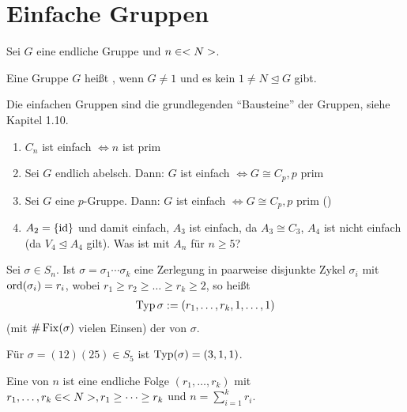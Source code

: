 \section{Einfache Gruppen}

Sei $G$ eine endliche Gruppe und $n \in <N>$.

\begin{definition}
	Eine Gruppe $G$ heißt , wenn $G \neq 1$ und es kein $1 \neq N \unlhd G$ gibt. %
\end{definition}

\begin{remark}
	Die einfachen Gruppen sind die grundlegenden ``Bausteine'' der Gruppen, siehe Kapitel 1.10.
\end{remark}

\begin{example}
	\begin{enumerate}
		\item $C_n$ ist einfach $\Leftrightarrow n$ ist prim
		\item Sei $G$ endlich abelsch. Dann: $G$ ist einfach $\Leftrightarrow G \cong C_p, p$ prim
		\item Sei $G$ eine $p$-Gruppe. Dann: $G$ ist einfach $\Leftrightarrow G \cong C_p, p$ prim ()
		\item $A_2 = \{\operatorname{id}\}$ und damit einfach, $A_3$ ist einfach, da $A_3 \cong C_3$, $A_4$ ist nicht einfach (da $V_4 \unlhd A_4$ gilt). Was ist mit $A_n$ für $n \geq 5$?
	\end{enumerate}
\end{example}

\begin{definition}[Typ]
	Sei $\sigma \in S_n$. Ist $\sigma = \sigma_1\cdots \sigma_k$ eine Zerlegung in paarweise disjunkte Zykel $\sigma_i$ mit $\operatorname{ord}(\sigma_i)=r_i$, wobei $r_1 \geq r_2 \geq \dots \geq r_k \geq 2$, so heißt
	\begin{align}
	\operatorname{Typ}{\sigma} := (r_1,\dots,r_k,1,\dots,1)\notag
	\end{align}
	(mit $\#\operatorname{Fix}(\sigma)$ vielen Einsen) der  von $\sigma$.
\end{definition}

\begin{example}
	Für $\sigma = (12)(25) \in S_5$ ist $\operatorname{Typ}(\sigma) = (3,1,1)$.
\end{example}

\begin{definition}[Partition]
	Eine  von $n$ ist eine endliche Folge $(r_1,\dots,r_k)$ mit $r_1,\dots,r_k \in <N>,r_1\geq\dots\geq r_k$ und $n = \sum_{i=1}^{k} r_i$.
\end{definition}

